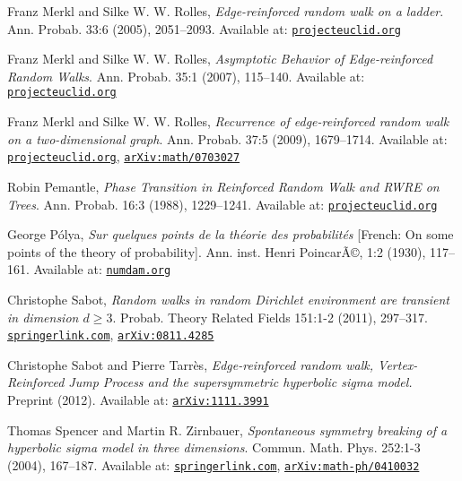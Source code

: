 \documentclass{emsprocart}
\theoremstyle{plain}
\begin{document}
\begin{thebibliography}{10}
Franz Merkl and Silke W. W. Rolles, \emph{Edge-reinforced
random walk on a ladder}. Ann. Probab. 33:6 (2005), 2051--2093. Available
at: \href{http://projecteuclid.org/euclid.aop/1133965853}{\nolinkurl{projecteuclid.org}}

Franz Merkl and Silke W. W. Rolles, \emph{Asymptotic
Behavior of Edge-reinforced Random Walks}. Ann. Probab. 35:1 (2007),
115--140. Available at: \href{http://projecteuclid.org/euclid.aop/1174324125}{\nolinkurl{projecteuclid.org}}

Franz Merkl and Silke W. W. Rolles, \emph{Recurrence
of edge-reinforced random walk on a two-dimensional graph}. Ann. Probab.
37:5 (2009), 1679--1714. Available at: \href{http://projecteuclid.org/euclid.aop/1253539854}{\nolinkurl{projecteuclid.org}},
\href{http://arxiv.org/abs/math/0703027}{\nolinkurl{arXiv:math/0703027}}

Robin Pemantle, \emph{Phase Transition in Reinforced
Random Walk and RWRE on Trees}. Ann. Probab. 16:3 (1988), 1229--1241.
Available at: \href{http://projecteuclid.org/euclid.aop/1176991687}{\nolinkurl{projecteuclid.org}}

George P\'olya, \emph{Sur quelques points de la th\'eorie
des probabilit\'es} {[}French: On some points of the theory of probability{]}.
Ann. inst. Henri PoincarÃ©, 1:2 (1930), 117--161. Available at: \href{http://www.numdam.org/numdam-bin/fitem?id=AIHP_1930__1_2_117_0}{\nolinkurl{numdam.org}}

Christophe Sabot, \emph{Random walks in random Dirichlet
environment are transient in dimension $d\geq3$}. Probab. Theory
Related Fields 151:1-2 (2011), 297--317. \href{http://www.springerlink.com/content/24480204un6v607x/}{\nolinkurl{springerlink.com}},
\href{http://arxiv.org/abs/0811.4285}{\nolinkurl{arXiv:0811.4285}}

Christophe Sabot and Pierre Tarr\`es, \textit{Edge-reinforced
random walk, Vertex-Reinforced Jump Process and the supersymmetric
hyperbolic sigma model.} Preprint (2012). Available at: \href{http://arxiv.org/abs/1111.3991}{\nolinkurl{arXiv:1111.3991}}

Thomas Spencer and Martin R. Zirnbauer, \emph{Spontaneous
symmetry breaking of a hyperbolic sigma model in three dimensions}.
Commun. Math. Phys. 252:1-3 (2004), 167--187. Available at: \href{http://www.springerlink.com/content/06tcd263nyxkxyxu/}{\nolinkurl{springerlink.com}},
\href{http://arxiv.org/abs/math-ph/0410032}{\nolinkurl{arXiv:math-ph/0410032}}\end{thebibliography}
\end{document}
